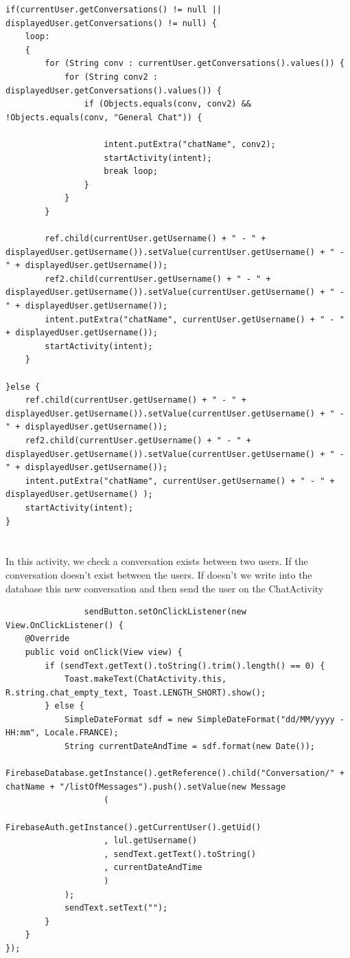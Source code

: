 \documentclass[paper=a4, fontsize=12pt,DIV=14]{scrartcl}    %
\begin{document}
\begin{lstlisting}
if(currentUser.getConversations() != null || displayedUser.getConversations() != null) {
    loop:
    {
        for (String conv : currentUser.getConversations().values()) {
            for (String conv2 : displayedUser.getConversations().values()) {
                if (Objects.equals(conv, conv2) && !Objects.equals(conv, "General Chat")) {

                    intent.putExtra("chatName", conv2);
                    startActivity(intent);
                    break loop;
                }
            }
        }

        ref.child(currentUser.getUsername() + " - " + displayedUser.getUsername()).setValue(currentUser.getUsername() + " - " + displayedUser.getUsername());
        ref2.child(currentUser.getUsername() + " - " + displayedUser.getUsername()).setValue(currentUser.getUsername() + " - " + displayedUser.getUsername());
        intent.putExtra("chatName", currentUser.getUsername() + " - " + displayedUser.getUsername());
        startActivity(intent);
    }

}else {
    ref.child(currentUser.getUsername() + " - " + displayedUser.getUsername()).setValue(currentUser.getUsername() + " - " + displayedUser.getUsername());
    ref2.child(currentUser.getUsername() + " - " + displayedUser.getUsername()).setValue(currentUser.getUsername() + " - " + displayedUser.getUsername());
    intent.putExtra("chatName", currentUser.getUsername() + " - " + displayedUser.getUsername() );
    startActivity(intent);
}


        	\end{lstlisting}

        \paragraph{}In this activity, we check a conversation exists between two users. If the conversation doesn’t exist between the users. If doesn’t we write into the database this new conversation and then send the user on the ChatActivity


        	\begin{lstlisting}
        		sendButton.setOnClickListener(new View.OnClickListener() {
    @Override
    public void onClick(View view) {
        if (sendText.getText().toString().trim().length() == 0) {
            Toast.makeText(ChatActivity.this, R.string.chat_empty_text, Toast.LENGTH_SHORT).show();
        } else {
            SimpleDateFormat sdf = new SimpleDateFormat("dd/MM/yyyy - HH:mm", Locale.FRANCE);
            String currentDateAndTime = sdf.format(new Date());
            FirebaseDatabase.getInstance().getReference().child("Conversation/" + chatName + "/listOfMessages").push().setValue(new Message
                    (
                    FirebaseAuth.getInstance().getCurrentUser().getUid()
                    , lul.getUsername()
                    , sendText.getText().toString()
                    , currentDateAndTime
                    )
            );
            sendText.setText("");
        }
    }
});

        	\end{lstlisting}
\end{document}
